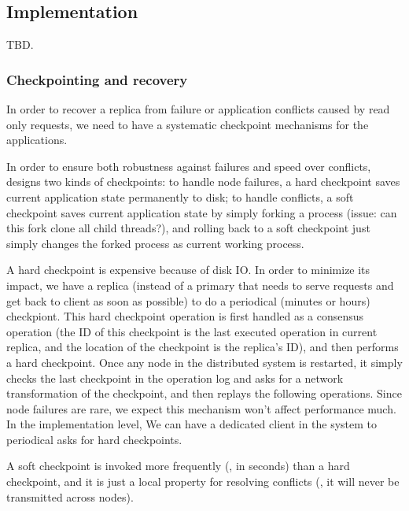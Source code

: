 

\subsection{Implementation} \label{sec:replication-impl}
TBD.

\subsubsection{Checkpointing and recovery} \label{sec:replication-impl-checkpoint}
In order to recover a replica from failure or application conflicts caused by 
read only requests, we need to have a systematic checkpoint mechanisms for the applications.

In order to ensure both robustness against failures and speed over conflicts, 
\msmr designs two kinds of checkpoints: to handle node failures, a hard checkpoint saves current application 
state permanently to 
disk; to handle conflicts, a soft checkpoint saves current application state by 
simply forking a process (issue: can this fork clone all child threads?), and 
rolling back to a soft checkpoint just simply changes the forked process as 
current working process.

A hard checkpoint is expensive because of disk IO. In order to minimize its 
impact, we have a replica (instead of a primary that needs to serve requests 
and get back to client as soon as possible) to do a periodical (minutes or hours) checkpiont. This 
hard checkpoint operation is first handled as a \paxos consensus operation (the 
ID of this checkpoint is the last executed \paxos operation in current 
replica, and the location of the checkpoint is the replica's ID), and then performs a hard checkpoint.
Once any node in the distributed 
system is restarted, it simply checks the last checkpoint in the \paxos 
operation log and asks for a network transformation of the checkpoint, and 
then replays the following operations. Since node failures are rare, we expect 
this mechanism won't affect performance much. In the implementation level, We can have a dedicated
client in the system to periodical asks for hard checkpoints.

A soft checkpoint is invoked more frequently (\eg, in seconds) than a hard 
checkpoint, and it is just a local property for resolving conflicts (\ie, it will never 
be transmitted across nodes).

